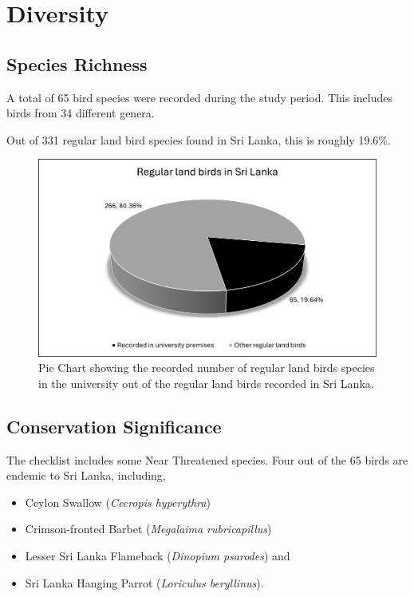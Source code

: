 \chapter{Diversity}
\label{cp:Diversity}

\section{Species Richness}
A total of 65 bird species were recorded during the study period. This includes birds from 34 different genera. 

Out of 331 regular land bird species found in Sri Lanka, this is roughly 19.6\%.

\begin{figure}[!htpb]
    \centering
    \includegraphics[width=\linewidth]{Figures/pieChart1.png}
    \caption[]{Pie Chart showing the recorded number of regular land birds species in the university out of the regular land birds recorded in Sri Lanka.}
    \label{fig:figure-01}
\end{figure}


\section{Conservation Significance}
The checklist includes some Near Threatened species. Four out of the 65 birds are endemic to Sri Lanka, including,
\begin{itemize}
    \item Ceylon Swallow (\textit{Cecropis hyperythra})
\item Crimson-fronted Barbet (\textit{Megalaima rubricapillus})
\item Lesser Sri Lanka Flameback (\textit{Dinopium psarodes}) and
 \item Sri Lanka Hanging Parrot (\textit{Loriculus beryllinus}).
\end{itemize}


